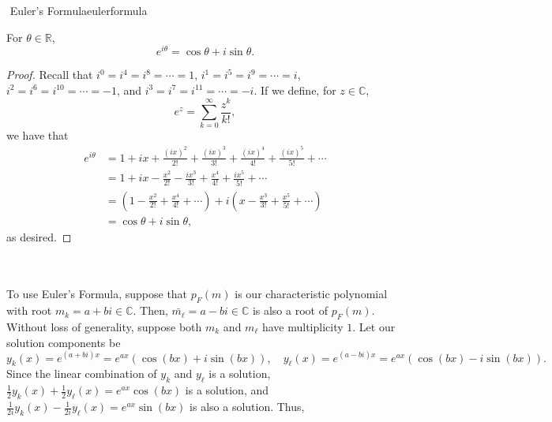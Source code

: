         \pagebreak
        \begin{theorem}{\Stop\,\,Euler's Formula}{eulerformula}

            For \(\theta\in\mathbb{R}\),
            \begin{equation*}
                e^{i\theta}=\cos\theta+i\sin\theta.
            \end{equation*}
            \begin{proof}
                Recall that \(i^0=i^4=i^8=\cdots=1\), \(i^1=i^5=i^9=\cdots=i\), \(i^2=i^6=i^10=\cdots=-1\), and \(i^3=i^7=i^{11}=\cdots=-i\). If we define, for \(z\in\mathbb{C}\), 
                \begin{equation*}
                    e^z=\sum_{k=0}^\infty \frac{z^k}{k!},
                \end{equation*}
                we have that
                \begin{align*}
                    e^{i\theta}&=1+ix+\frac{(ix)^2}{2!}+\frac{(ix)^3}{3!}+\frac{(ix)^4}{4!}+\frac{(ix)^5}{5!}+\cdots \\
                    &=1+ix-\frac{x^2}{2!}-\frac{ix^3}{3!}+\frac{x^4}{4!}+\frac{ix^5}{5!}+\cdots \\
                    &=\left(1-\frac{x^2}{2!}+\frac{x^4}{4!}+\cdots\right)+i\left(x-\frac{x^3}{3!}+\frac{x^5}{5!}+\cdots\right) \\
                    &=\cos\theta+i\sin\theta,
                \end{align*}
                as desired.
            \end{proof}
            
        \end{theorem}
        \vphantom
        \\
        \\
        To use Euler's Formula, suppose that \(p_F(m)\) is our characteristic polynomial with root \(m_k=a+bi\in\mathbb{C}\). Then, \(\bar{m_\ell}=a-bi\in\mathbb{C}\) is also a root of \(p_F(m)\). Without loss of generality, suppose both \(m_k\) and \(m_\ell\) have multiplicity \(1\). Let our solution components be
        \begin{equation*}
            y_k(x)=e^{(a+bi)x}=e^{ax}(\cos(bx)+i\sin(bx)),\quad y_\ell(x)=e^{(a-bi)x}=e^{ax}(\cos(bx)-i\sin(bx)).
        \end{equation*}
        Since the linear combination of \(y_k\) and \(y_\ell\) is a solution, \(\frac{1}{2}y_k(x)+\frac{1}{2}y_\ell(x)=e^{ax}\cos(bx)\) is a solution, and \(\frac{1}{2i}y_k(x)-\frac{1}{2i}y_\ell(x)=e^{ax}\sin(bx)\) is also a solution. Thus,
